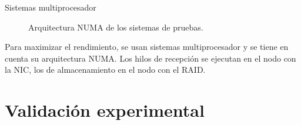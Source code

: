\documentclass[10pt,notes,compress,usetitleprogressbar,aspectratio=1610]{beamer}
\begin{document}
\begin{frame}{Sistemas multiprocesador}

\begin{figure}[tbp]
\centering
\footnotesize
\resizebox{0.7\textwidth}{!}{
}
\caption{Arquitectura NUMA de los sistemas de pruebas.}
\label{fig:Validacion:NUMAArch}
\end{figure}

Para maximizar el rendimiento, se usan sistemas multiprocesador y se tiene en cuenta su arquitectura NUMA. Los hilos de recepción se ejecutan en el nodo con la NIC, los de almacenamiento en el nodo con el RAID.

\end{frame}

\section{Validación experimental}
\end{document}
